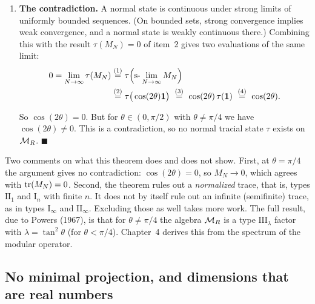 \begin{keyresult}[: No normalized trace away from $\theta=\pi/4$]
\begin{enumerate}[leftmargin=*]
\item \textbf{The contradiction.}
A normal state is continuous under strong limits of uniformly bounded sequences. (On bounded sets, strong
convergence implies weak convergence, and a normal state is weakly continuous there.) Combining this with the
result $\tau(M_N)=0$ of item~2 gives two evaluations of the same limit:
\begin{align}
0 = \lim_{N\to\infty}\tau(M_N)
&\overset{(1)}{=} \tau\Big(\mathrm{s\text{-}}\lim_{N\to\infty} M_N\Big) \notag\\
&\overset{(2)}{=} \tau\big(\cos(2\theta)\mathbf{1}\big)
\ \overset{(3)}{=}\ \cos(2\theta)\,\tau(\mathbf{1})
\ \overset{(4)}{=}\ \cos(2\theta) . \notag
\end{align}
\quad
{}\quad
{}\quad
{}

So $\cos(2\theta)=0$. But for $\theta \in (0, \pi/2)$ with $\theta\ne\pi/4$ we have $\cos(2\theta)\ne0$. This
is a contradiction, so no normal tracial state $\tau$ exists on $\mathcal{M}_R$. $\blacksquare$
\end{enumerate}
\end{keyresult}

Two comments on what this theorem does and does not show. First, at $\theta=\pi/4$ the argument gives no
contradiction: $\cos(2\theta)=0$, so $M_N\to0$, which agrees with $\operatorname{tr}(M_N)=0$. Second, the theorem rules out a
\emph{normalized} trace, that is, types $\mathrm{II}_1$ and $\mathrm{I}_n$ with finite $n$. It does not by
itself rule out an infinite (semifinite) trace, as in types $\mathrm{I}_\infty$ and $\mathrm{II}_\infty$.
Excluding those as well takes more work. The full result, due to Powers (1967), is that for $\theta\ne\pi/4$ the
algebra $\mathcal{M}_R$ is a type $\mathrm{III}_\lambda$ factor with $\lambda=\tan^2\theta$ (for $\theta<\pi/4$).
Chapter~4 derives this from the spectrum of the modular operator.

\subsection*{No minimal projection, and dimensions that are real numbers}

